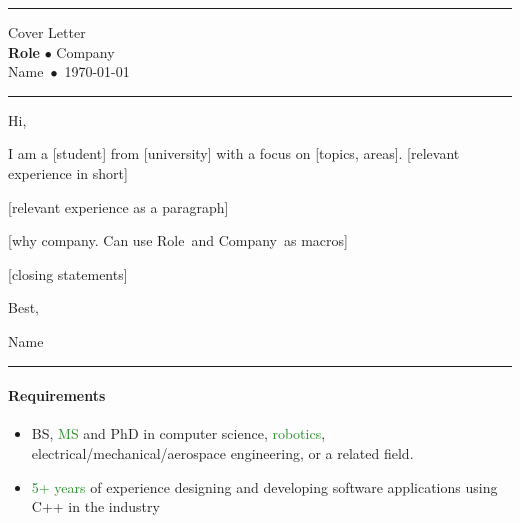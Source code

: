 \documentclass[11pt, a4paper]{article}
\newcommand{\green}[1]{\textcolor{ForestGreen}{#1}}
\newcommand{\tick}{\green{\faCheckCircle}}
\newcommand{\name}{Blank}
\newcommand{\role}{Role}
\newcommand{\company}{Company}
\newcommand{\coverletterheader}{\hrule
    \begin{center}
        \large Cover Letter\\
        \Large\textbf{\role} $\bullet$ \company\\
        \large\name~$\bullet$~\today\\
        \normalsize
    \end{center}
    \hrule\bigskip
}
\newenvironment{skills}[1]{\paragraph{\textsf{#1}}\begin{itemize}\setlength\itemsep{0em}}{\end{itemize}}
\renewcommand{\name}{Name}
\renewcommand{\role}{Role}
\renewcommand{\company}{Company}
\begin{document}
\selectfont

\thispagestyle{empty}

\coverletterheader

\noindent Hi,

\medskip
I am a [student] from [university] with a focus on [topics, areas]. 
[relevant experience in short]

\medskip

[relevant experience as a paragraph]

\medskip

[why company. Can use \role~and \company~as macros]

\medskip

[closing statements]

\medskip

\noindent Best,

\noindent \name

\vfill

\hrule

\begin{skills}{Requirements}
    \item[\tick] BS, \green{MS} and PhD in computer science, \green{robotics}, electrical/mechanical/aerospace engineering, or a related field.
    \item \green{5+ years} of experience designing and developing software applications using C++ in the industry
\end{skills}
\end{document}
